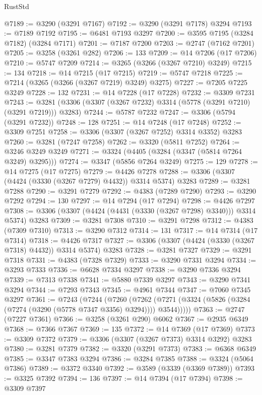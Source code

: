 \begin{lexlean}{RustStd}
\begin{coremodule}
@7189 := @3290 (@3291 @7167)
@7192 := @3290 (@3291 @7178) @3294
@7193 := @7189 @7192
@7195 := @6481 @7193 @3297
@7200 := @3595 @7195 (@3284 @7182) (@3284 @7171)
@7201 := @7187 @7200
@7203 := @2747 (@7162 @7201)
@7205 := @3258 (@3261 @282)
@7206 := 133
@7209 := @14 @7206 (@17 @7206)
@7210 := @5747 @7209
@7214 := @3265 (@3266 (@3267 @7210) @3249)
@7215 := 134
@7218 := @14 @7215 (@17 @7215)
@7219 := @5747 @7218
@7225 := @7214 (@3265 (@3266 (@3267 @7219) @3249) @3275)
@7227 := @7205 @7225 @3249
@7228 := 132
@7231 := @14 @7228 (@17 @7228)
@7232 := @3309 @7231
@7243 := @3281 (@3306 (@3307 (@3267 @7232) @3314 (@5778 (@3291 @7210) (@3291 @7219))) @3283)
@7244 := @5787 @7232
@7247 := @3306 (@5794 (@3291 @7232))
@7248 := 128
@7251 := @14 @7248 (@17 @7248)
@7252 := @3309 @7251
@7258 := @3306 (@3307 (@3267 @7252) @3314 @3352) @3283
@7260 := @3281 (@7247 @7258)
@7262 := @3320 (@5811 @7252)
@7264 := @3246 @3249 @3249
@7271 := @3324 (@4405 (@3284 (@3347 (@5814 @7264 @3249) @3295)))
@7274 := @3347 (@5856 @7264 @3249)
@7275 := 129
@7278 := @14 @7275 (@17 @7275)
@7279 := @4426 @7278
@7288 := @3306 (@3307 (@4424 (@3330 (@3267 @7279) @4432)) @3314 @5374) @3283
@7289 := @3281 @7288
@7290 := @3291 @7279
@7292 := @4383 (@7289 @7290)
@7293 := @3290 @7292
@7294 := 130
@7297 := @14 @7294 (@17 @7294)
@7298 := @4426 @7297
@7308 := @3306 (@3307 (@4424 (@4431 (@3330 (@3267 @7298) @3340))) @3314 @5374) @3283
@7309 := @3281 @7308
@7310 := @3291 @7298
@7312 := @4383 (@7309 @7310)
@7313 := @3290 @7312
@7314 := 131
@7317 := @14 @7314 (@17 @7314)
@7318 := @4426 @7317
@7327 := @3306 (@3307 (@4424 (@3330 (@3267 @7318) @4432)) @3314 @5374) @3283
@7328 := @3281 @7327
@7329 := @3291 @7318
@7331 := @4383 (@7328 @7329)
@7333 := @3290 @7331 @3294
@7334 := @3293 @7333
@7336 := @6628 @7334 @3297
@7338 := @3290 @7336 @3294
@7339 := @7313 @7338
@7341 := @5880 @7339 @3297
@7343 := @3290 @7341 @3294
@7344 := @7293 @7343
@7345 := @4961 @7344
@7347 := @7060 @7345 @3297
@7361 := @7243
    (@7244
      (@7260
        (@7262 (@7271 (@3324 (@5826 (@3284 (@7274 (@3290 (@5778 @7347 @3356) @3294)))) @3544)))))
@7363 := @2747 (@7227 @7361)
@7366 := @3258 (@3261 @290) @6062
@7367 := @2935 @6349
@7368 := @7366 @7367
@7369 := 135
@7372 := @14 @7369 (@17 @7369)
@7373 := @3309 @7372
@7379 := @3306 (@3307 (@3267 @7373) @3314 @3292) @3283
@7380 := @3281 @7379
@7382 := @3320 (@3291 @7373)
@7383 := @6368 @6349
@7385 := @3347 @7383 @3294
@7386 := @3284 @7385
@7388 := @3324 (@5064 @7386)
@7389 := @3372 @3340
@7392 := @3589 (@3339 (@3369 @7389))
@7393 := @3325 @7392
@7394 := 136
@7397 := @14 @7394 (@17 @7394)
@7398 := @3309 @7397

\end{coremodule}
\end{lexlean}
